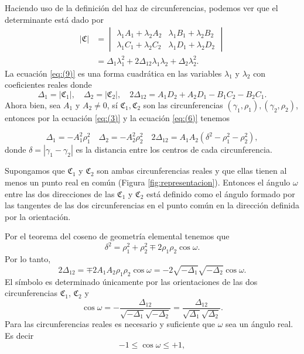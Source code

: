 \documentclass{matematicasud}
\begin{document}
Haciendo uso de la definición del haz de circunferencias, podemos ver que el determinante está dado por
\begin{align}
    |\mathfrak{C}|&=
    \begin{vmatrix}
        \lambda_1A_1+\lambda_2A_2 & \lambda_1B_1+\lambda_2B_2\\
        \lambda_1C_1+\lambda_2C_2 &
        \lambda_1D_1+\lambda_2D_2
    \end{vmatrix}\\
    &=\Delta_1\lambda^2_1+2\Delta_{12}\lambda_1\lambda_2+\Delta_2\lambda^2_2.
    \label{eq:(9)}
\end{align}
La ecuación \eqref{eq:(9)} es una forma cuadrática en las variables $\lambda_1$ y $\lambda_2$ con coeficientes reales donde 
\begin{equation}
    \Delta_1=|\mathfrak{C}_1|,\quad\Delta_2=|\mathfrak{C}_2|,\quad 2\Delta_{12}=A_1D_2+A_2D_1-B_1C_2-B_2C_1.
    \label{eq:(10)}
\end{equation}
Ahora bien, sea $A_1$ y $A_2 \neq 0$, sí $\mathfrak{C}_1,\mathfrak{C}_2$ son las circunferencias $(\gamma_1,\rho_1),(\gamma_2,\rho_2)$, entonces por la ecuación \eqref{eq:(3)} y la ecuación \eqref{eq:(6)} tenemos

\begin{equation}
    \Delta_1=-A_1^2\rho_1^2 \quad \Delta_2=-A_2^2\rho^2_2 \quad 2\Delta_{12}=A_1A_2(\delta^2-\rho^2_1-\rho^2_2),
    \label{eq:11}
\end{equation}
donde $\delta =|\gamma_1-\gamma_2|$ es la distancia entre los centros de cada circunferencia.

Supongamos que $\mathfrak{C}_1$ y $\mathfrak{C}_2$ son ambas circunferencias reales y que ellas tienen al menos un punto real en común (Figura \ref{fig:representacion}). Entonces el ángulo $\omega$ entre las dos direcciones de las $\mathfrak{C}_1$ y $\mathfrak{C}_2$ está definido como el ángulo formado por las tangentes de las dos circunferencias en el punto común en la dirección definida por la orientación.

Por el teorema del coseno de geometría elemental tenemos que 
\begin{equation}
    \delta^2=\rho^2_1+\rho^2_2\mp2\rho_1\rho_2\cos{\omega}.
    \label{eq:(12)}
\end{equation}
Por lo tanto,
\begin{equation}
    2\Delta_{12}=\mp2A_1A_2\rho_1\rho_2\cos{\omega}=-2\sqrt{-\Delta_1}\sqrt{-\Delta_2}\cos{\omega}.
    \label{eq:(13)}
\end{equation}
El símbolo es determinado únicamente por las orientaciones de las dos circunferencias $\mathfrak{C}_1$, $\mathfrak{C}_2$ y 
\begin{equation}
    \cos{\omega}=-\frac{\Delta_{12}}{\sqrt{-\Delta_1}\sqrt{-\Delta_2}}=\frac{\Delta_{12}}{\sqrt{\Delta_1}\sqrt{\Delta_2}}.
    \label{eq:(14)}
\end{equation}
Para las circunferencias reales es necesario y suficiente que $\omega$ sea un ángulo real. Es decir
\begin{equation*}
    -1 \leq \cos{\omega} \leq +1,
\end{equation*}
\end{document}
